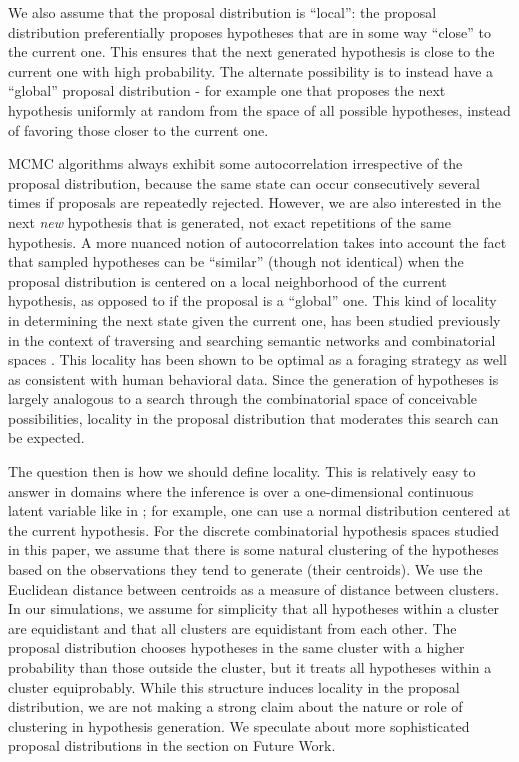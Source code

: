 We also assume that the proposal distribution is ``local'': the proposal distribution preferentially proposes hypotheses that are in some way ``close'' to the current one. This ensures that the next generated hypothesis is close to the current one with high probability. The alternate possibility is to instead have a ``global'' proposal distribution - for example one that proposes the next hypothesis uniformly at random from the space of all possible hypotheses, instead of favoring those closer to the current one.

MCMC algorithms always exhibit some autocorrelation irrespective of the proposal distribution, because the same state can occur consecutively several times if proposals are repeatedly rejected. However, we are also interested in the next \textit{new} hypothesis that is generated, not exact repetitions of the same hypothesis. A more nuanced notion of autocorrelation  takes into account the fact that sampled hypotheses can be ``similar'' (though not identical) when the proposal distribution is centered on a local neighborhood of the current hypothesis, as opposed to if the proposal is a ``global'' one. This kind of locality in determining the next state given the current one, has been studied previously in the context of traversing and searching semantic networks \citep{abbott2015random} and combinatorial spaces \citep{smith2013multiply}. This locality has been shown to be optimal as a foraging strategy \citep{hills2012optimal} as well as consistent with human behavioral data. Since the generation of hypotheses is largely analogous to a search through the combinatorial space of conceivable possibilities, locality in the proposal distribution that moderates this search can be expected.

The question then is how we should define locality. This is relatively easy to answer in domains where the inference is over a one-dimensional continuous latent variable like in \cite{Lieder2013}; for example, one can use a normal distribution centered at the current hypothesis. For the discrete combinatorial hypothesis spaces studied in this paper, we assume that there is some natural clustering of the hypotheses based on the observations they tend to generate (their centroids). We use the Euclidean distance between centroids as a measure of distance between clusters. In our simulations, we assume for simplicity that all hypotheses within a cluster are equidistant and that all clusters are equidistant from each other. The proposal distribution chooses hypotheses in the same cluster with a higher probability than those outside the cluster, but it treats all hypotheses within a cluster equiprobably. While this structure induces locality in the proposal distribution, we are not making a strong claim about the nature or role of clustering in hypothesis generation. We speculate about more sophisticated proposal distributions in the section on Future Work. 

